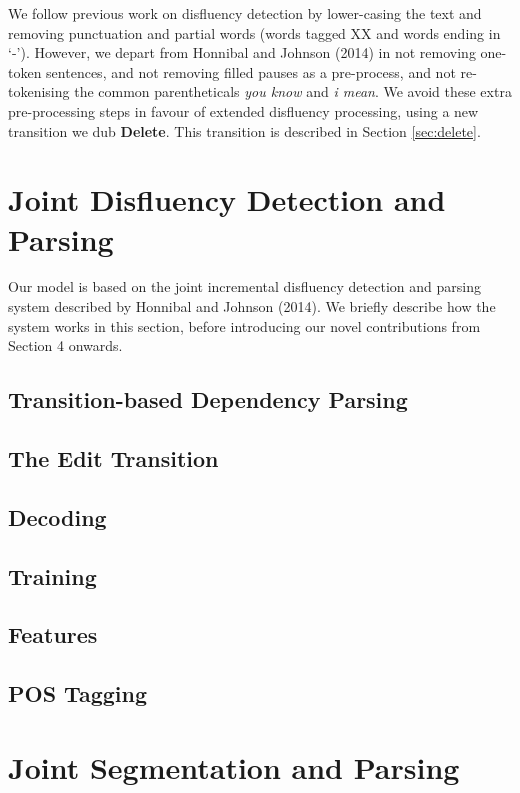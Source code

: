 \documentclass[11pt,letterpaper]{article}
\begin{document}
We follow previous work on disfluency detection by lower-casing the text and
removing punctuation and partial words (words tagged XX and words ending in
`-').  However, we depart from Honnibal and Johnson (2014) in not removing one-token
sentences, and not removing filled pauses as a pre-process, and not
re-tokenising the common parentheticals \emph{you know} and \emph{i mean}.
We avoid these extra pre-processing steps in favour of extended disfluency processing,
using a new transition we dub \textbf{Delete}.  This transition is described in
Section \ref{sec:delete}.

\section{Joint Disfluency Detection and Parsing}

Our model is based on the joint incremental disfluency detection and parsing
system described by Honnibal and Johnson (2014).  We briefly describe how the
system works in this section, before introducing our novel contributions from
Section 4 onwards.

\subsection{Transition-based Dependency Parsing}

\subsection{The Edit Transition}

\subsection{Decoding}

\subsection{Training}

\subsection{Features}

\subsection{POS Tagging}

\clearpage

\section{Joint Segmentation and Parsing}
\end{document}
